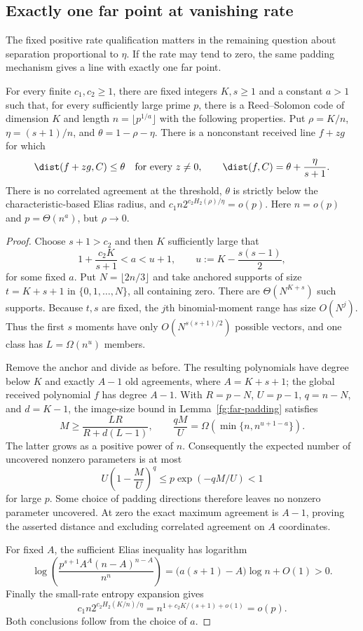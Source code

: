 \subsection{Exactly one far point at vanishing rate}
\label{sec:vanishing-rate}

The fixed positive rate qualification matters in the remaining question
about separation proportional to $\eta$. If the rate may tend to zero,
the same padding mechanism gives a line with exactly one far point.

\begin{theorem}\label{fg:punctured-line}
For every finite $c_1,c_2\ge1$, there are fixed integers $K,s\ge1$ and
a constant $a>1$ such that, for every sufficiently large prime $p$,
there is a Reed--Solomon code of dimension $K$ and length
$n=\lfloor p^{1/a}\rfloor$ with the following properties.
Put $\rho=K/n$, $\eta=(s+1)/n$, and $\theta=1-\rho-\eta$.
There is a nonconstant received line $f+zg$ for which
\[
 \dist(f+zg,C)\le\theta\quad\text{for every }z\ne0,
 \qquad
 \dist(f,C)=\theta+\frac{\eta}{s+1}.
\]
There is no correlated agreement at the threshold, $\theta$ is strictly
below the characteristic-based Elias radius, and
$c_1n2^{c_2H_2(\rho)/\eta}=o(p)$.
Here $n=o(p)$ and $p=\Theta(n^a)$, but $\rho\to0$.
\end{theorem}
\begin{proof}
Choose $s+1>c_2$ and then $K$ sufficiently large that
\[
 1+\frac{c_2K}{s+1}<a<u+1,
 \qquad u:=K-\frac{s(s-1)}2,
\]
for some fixed $a$. Put $N=\lfloor2n/3\rfloor$ and take anchored
supports of size $t=K+s+1$ in $\{0,1,\ldots,N\}$, all containing zero.
There are $\Theta(N^{K+s})$ such supports. Because $t,s$ are fixed,
the $j$th binomial-moment range has size $O(N^j)$. Thus the first $s$
moments have only $O(N^{s(s+1)/2})$ possible vectors, and one class
has $L=\Omega(n^u)$ members.

Remove the anchor and divide as before. The resulting polynomials
have degree below $K$ and exactly $A-1$ old agreements, where
$A=K+s+1$; the global received polynomial $f$ has degree $A-1$.
With $R=p-N$, $U=p-1$, $q=n-N$, and $d=K-1$, the image-size bound
in Lemma~\ref{fg:far-padding} satisfies
\[
 M\ge\frac{LR}{R+d(L-1)},\qquad
 \frac{qM}{U}=\Omega\!\left(\min\{n,n^{u+1-a}\}\right).
\]
The latter grows as a positive power of $n$. Consequently the
expected number of uncovered nonzero parameters is at most
\[
 U\left(1-\frac MU\right)^q
 \le p\exp(-qM/U)<1
\]
for large $p$. Some choice of padding directions therefore leaves
no nonzero parameter uncovered. At zero the exact maximum agreement
is $A-1$, proving the asserted distance and excluding correlated
agreement on $A$ coordinates.

For fixed $A$, the sufficient Elias inequality has logarithm
\[
 \log\!\left(\frac{p^{s+1}A^A(n-A)^{n-A}}{n^n}\right)
 =\bigl(a(s+1)-A\bigr)\log n+O(1)>0.
\]
Finally the small-rate entropy expansion gives
\[
 c_1n2^{c_2H_2(K/n)/\eta}
 =n^{1+c_2K/(s+1)+o(1)}=o(p).
\]
Both conclusions follow from the choice of $a$.
\end{proof}

